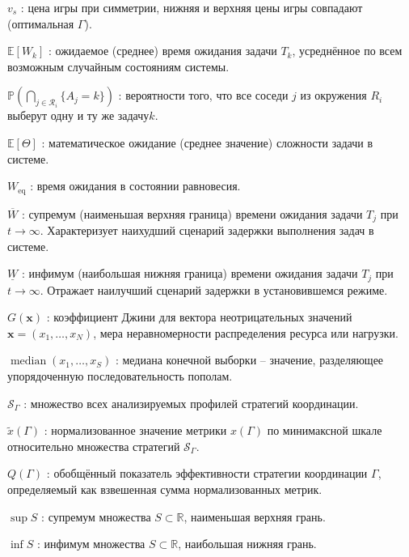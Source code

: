$v_s$ : цена игры при симметрии, нижняя и верхняя цены игры совпадают (оптимальная $\Gamma$).

$\mathbb{E}[W_k]$ : ожидаемое (среднее) время ожидания задачи $T_k$, усреднённое по всем возможным случайным состояниям системы.

$\mathbb{P}\left( \bigcap_{j \in \mathcal{R}_i} \{ A_j = k \} \right)$ : вероятности того, что все соседи $j$ из окружения $R_i$ ​выберут одну и ту же задачу$k$.

$\mathbb{E}[\Theta]$ : математическое ожидание (среднее значение) сложности задачи в системе.

$W_{\text{eq}}$ : время ожидания в состоянии равновесия.

$\overline{W}$ : супремум (наименьшая верхняя граница) времени ожидания задачи $T_j$ при $t \to \infty$. Характеризует наихудший сценарий задержки выполнения задач в системе.

$\underline{W}$ : инфимум (наибольшая нижняя граница) времени ожидания задачи $T_j$ при $t \to \infty$. Отражает наилучший сценарий задержки в установившемся режиме.

$G(\mathbf{x})$ : коэффициент Джини для вектора неотрицательных значений $\mathbf{x} = (x_1, \dots, x_N)$, мера неравномерности распределения ресурса или нагрузки.

$\operatorname{median}(x_1, \dots, x_S)$ : медиана конечной выборки -- значение, разделяющее упорядоченную последовательность пополам.

$\mathcal{S}_\Gamma$ : множество всех анализируемых профилей стратегий координации.

$\tilde{x}(\Gamma)$ : нормализованное значение метрики $x(\Gamma)$ по минимаксной шкале относительно множества стратегий $\mathcal{S}_\Gamma$.

$Q(\Gamma)$ : обобщённый показатель эффективности стратегии координации $\Gamma$, определяемый как взвешенная сумма нормализованных метрик.

$\sup S$ : супремум множества $S \subset \mathbb{R}$, наименьшая верхняя грань.

$\inf S$ : инфимум множества $S \subset \mathbb{R}$, наибольшая нижняя грань.